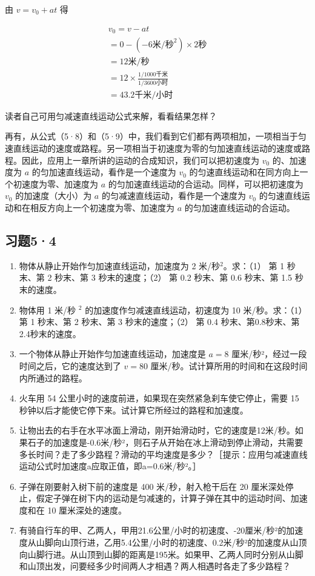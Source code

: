 由 \(v = v_{0} + at\) 得

\[
\begin{array}{l} v_{0}=v-at\\ =0-(-6\text{米/秒}^{2})\times2\text{秒}\\ =12\text{米/秒}\\ =12\times\frac{1/1000\text{千米}}{1/3600\text{小时}}\\ =43.2\text{千米/小时} \end{array}
\]

读者自己可用匀减速直线运动公式来解，看看结果怎样？

再有，从公式（5·8）和（5·9）中，我们看到它们都有两项相加，一项相当于匀速直线运动的速度或路程。另一项相当于初速度为零的匀加速直线运动的速度或路程。因此，应用上一章所讲的运动的合成知识，我们可以把初速度为
\(v_0\) 的、加速度为 \(a\) 的匀加速直线运动，看作是一个速度为 \(v_0\)
的匀速直线运动和在同方向上一个初速度为零、加速度为 \(a\)
的匀加速直线运动的合运动。同样，可以把初速度为 \(v_0\)
的加速度（大小）为 \(a\) 的匀减速直线运动，看作是一个速度为 \(v_0\)
的匀速直线运动和在相反方向上一个初速度为零、加速度为 \(a\)
的匀加速直线运动的合运动。

\subsection{习题5·4}\label{ux4e60ux989854}

\begin{enumerate}
\def\labelenumi{\arabic{enumi}.}
\item
  物体从静止开始作匀加速直线运动，加速度为 2 米/秒\(^{2}\)。求：（1） 第
  1 秒末、第 2 秒末、第 3 秒末的速度；（2） 第 0.2 秒末、第 0.6 秒末、第
  1.5 秒末的速度。
\item
  物体用 1 米/秒 \(^{2}\) 的加速度作匀减速直线运动，初速度为 10
  米/秒。求：（1） 第 1 秒末、第 2 秒末、第 3 秒末的速度；（2） 第 0.4
  秒末、第0.8秒末、第2.4秒末的速度。
\item
  一个物体从静止开始作匀加速直线运动，加速度是 \(a = 8\)
  厘米/秒²，经过一段时间之后，它的速度达到了 \(v = 80\)
  厘米/秒。试计算所用的时间和在这段时间内所通过的路程。
\item
  火车用 54 公里小时的速度前进，如果现在突然紧急刹车使它停止，需要 15
  秒钟以后才能使它停下来。试计算它所经过的路程和加速度。
\item
  让物出去的右手在水平冰面上滑动，刚开始滑动时，它的速度是12米/秒。如果石子的加速度是-0.6米/秒²，则石子从开始在冰上滑动到停止滑动，共需要多长时间？走了多少路程？滑动的平均速度是多少？［提示：应用匀减速直线运动公式时加速度a应取正值，即a=0.6米/秒²。］
\item
  子弹在刚要射入树下前的速度是 400 米/秒，射入枪干后在 20
  厘米深处停止，假定子弹在树下内的运动是匀减速的，计算子弹在其中的运动时间、加速度和在
  10 厘米深处的速度。
\item
  有骑自行车的甲、乙两人，甲用21.6公里/小时的初速度、-20厘米/秒²的加速度从山脚向山顶行进，乙用5.4公里/小时的初速度、0.2米/秒²的加速度从山顶向山脚行进。从山顶到山脚的距离是195米。如果甲、乙两人同时分别从山脚和山顶出发，问要经多少时间两人才相遇？两人相遇时各走了多少路程？
\end{enumerate}

